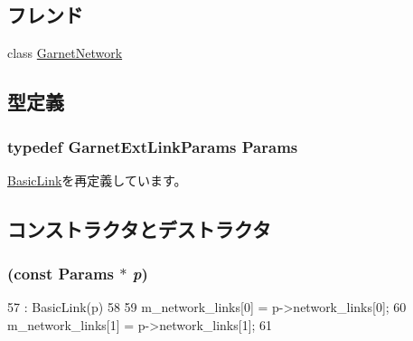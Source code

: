 \subsection*{フレンド}
\begin{DoxyCompactItemize}
\item 
class \hyperlink{classGarnetExtLink_a93e18c390666ec9c26269c22345e9e94}{GarnetNetwork}
\end{DoxyCompactItemize}


\subsection{型定義}
\hypertarget{classGarnetExtLink_abc394670035aa22f4cda698826986c13}{
\subsubsection[{Params}]{\setlength{\rightskip}{0pt plus 5cm}typedef GarnetExtLinkParams {\bf Params}}}
\label{classGarnetExtLink_abc394670035aa22f4cda698826986c13}


\hyperlink{classBasicLink_a2c371814143f1675a601e935bfbd756c}{BasicLink}を再定義しています。

\subsection{コンストラクタとデストラクタ}
\hypertarget{classGarnetExtLink_ab088e036def131358749fd8bf28c31d7}{
\subsubsection[{GarnetExtLink}]{ (const {\bf Params} $\ast$ {\em p})}}
\label{classGarnetExtLink_ab088e036def131358749fd8bf28c31d7}



\begin{DoxyCode}
57     : BasicLink(p)
58 {
59     m_network_links[0] = p->network_links[0];
60     m_network_links[1] = p->network_links[1];
61 }
\end{DoxyCode}


